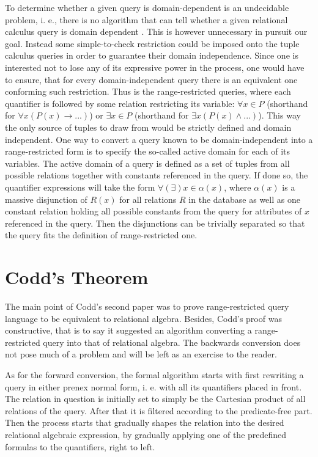 \documentclass[12pt]{article}
\begin{document}
To determine whether a given query is domain-dependent is an undecidable problem, i. e., there is no
algorithm that can tell whether a given relational calculus query is domain dependent \cite{kolatis}.
This is however unnecessary in pursuit our goal. Instead some simple-to-check restriction could be imposed
onto the tuple calculus queries in order to guarantee their domain independence. Since one is interested not
to lose any of its expressive power in the process, one would have to ensure, that
for every domain-independent query there is an equivalent one
conforming such restriction. Thus is the range-restricted queries, where each quantifier is followed
by some relation restricting its variable: $\forall x \in P$ (shorthand for
$\forall x (P(x)  \rightarrow  ...)$) or $\exists x \in P$ (shorthand for $\exists x (P(x) \wedge ...)$).
This way the only source of tuples to draw from would be strictly defined and domain independent.
One way to convert a query known to be domain-independent into a range-restricted form is to
specify the so-called active domain for each of its variables.
The active domain of a query is defined as a set of tuples from all possible relations together
with constants referenced in the query. If done so, the quantifier expressions
will take the form $ \forall(\exists) x \in \alpha(x) $, where
$\alpha(x)$ is a massive disjunction of $R(x)$ for all
relations $R$ in the database as well as one constant relation holding all possible constants from
the query for attributes of $x$ referenced in the query.
Then the disjunctions can be trivially separated so that the query fits the definition of range-restricted one.

\section{Codd's Theorem}

The main point of Codd's second paper was to prove range-restricted query language to be equivalent to relational algebra.
Besides, Codd's proof was constructive, that is to say it suggested an algorithm converting a
range-restricted query into that of relational algebra. The backwards conversion does not pose much of a problem
and will be left as an exercise to the reader.

As for the forward conversion, the formal algorithm starts
with first rewriting a query in either prenex normal form, i. e. with all its quantifiers placed in front.
The relation in question is initially set to simply be the Cartesian product of all relations of the query.
After that it is filtered according to the predicate-free part. Then the process starts that gradually shapes
the relation into the desired relational algebraic expression, by gradually applying one of the predefined formulas
to the quantifiers, right to left.
\end{document}
